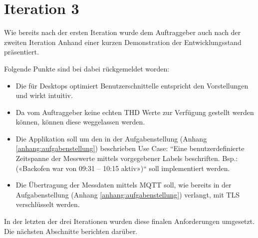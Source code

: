 \section{Iteration 3}
Wie bereits nach der ersten Iteration wurde dem Auftraggeber auch nach der zweiten Iteration
Anhand einer kurzen Demonstration der Entwicklungsstand präsentiert.

Folgende Punkte sind bei dabei rückgemeldet worden:
\begin{itemize}
    \item Die für Desktops optimiert Benutzerschnittelle entspricht den Vorstellungen und wirkt intuitiv.
    \item Da vom Auftraggeber keine echten \ac{THD} Werte zur Verfügung gestellt werden können,
          können diese weggelassen werden.
    \item Die Applikation soll um den in der Aufgabenstellung (Anhang \ref{anhang:aufgabenstellung}) beschrieben Use Case:
          ``Eine benutzerdefinierte Zeitspanne der Messwerte mittels vorgegebener
          Labels beschriften. Bsp.: («Backofen war von 09:31 – 10:15 aktiv»)`` soll implementiert werden.
    \item Die Übertragung der Messdaten mittels \ac{MQTT} soll,
          wie bereits in der Aufgabenstellung (Anhang \ref{anhang:aufgabenstellung}) verlangt, mit \ac{TLS} verschlüsselt werden.
\end{itemize}
In der letzten der drei Iterationen wurden diese finalen Anforderungen umgesetzt.
Die nächsten Abschnitte berichten darüber.

